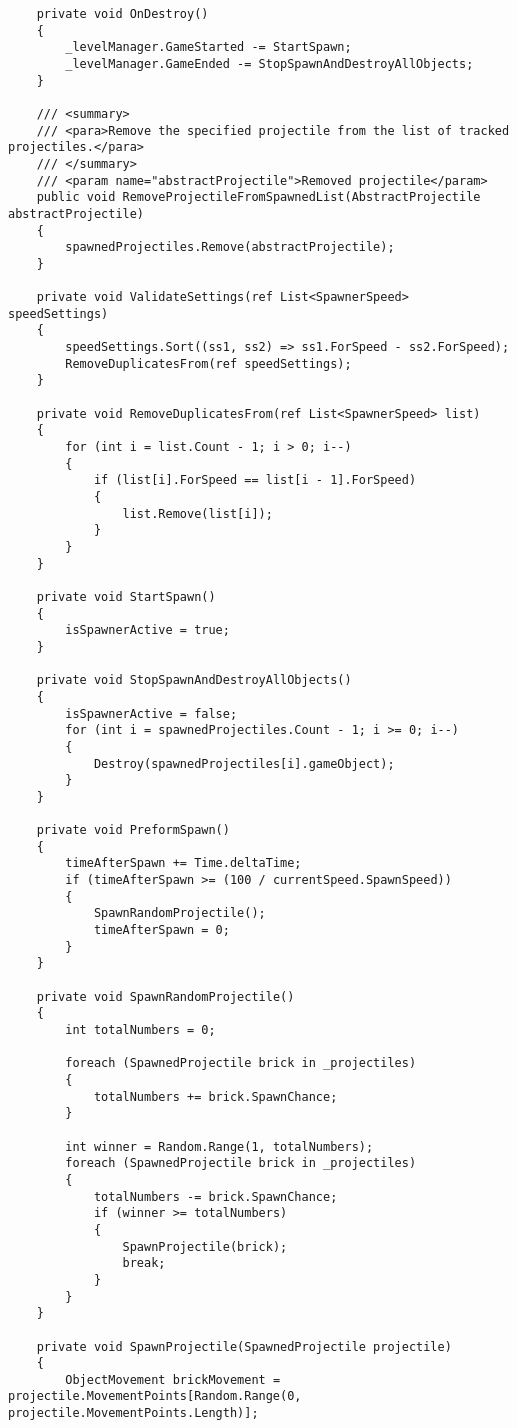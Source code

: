 \begin{verbatim}
    private void OnDestroy()
    {
        _levelManager.GameStarted -= StartSpawn;
        _levelManager.GameEnded -= StopSpawnAndDestroyAllObjects;
    }

    /// <summary>
    /// <para>Remove the specified projectile from the list of tracked projectiles.</para>
    /// </summary>
    /// <param name="abstractProjectile">Removed projectile</param>
    public void RemoveProjectileFromSpawnedList(AbstractProjectile abstractProjectile)
    {
        spawnedProjectiles.Remove(abstractProjectile);
    }

    private void ValidateSettings(ref List<SpawnerSpeed> speedSettings)
    {
        speedSettings.Sort((ss1, ss2) => ss1.ForSpeed - ss2.ForSpeed);
        RemoveDuplicatesFrom(ref speedSettings);
    }

    private void RemoveDuplicatesFrom(ref List<SpawnerSpeed> list)
    {
        for (int i = list.Count - 1; i > 0; i--)
        {
            if (list[i].ForSpeed == list[i - 1].ForSpeed)
            {
                list.Remove(list[i]);
            }
        }
    }

    private void StartSpawn()
    {
        isSpawnerActive = true;
    }

    private void StopSpawnAndDestroyAllObjects()
    {
        isSpawnerActive = false;
        for (int i = spawnedProjectiles.Count - 1; i >= 0; i--)
        {
            Destroy(spawnedProjectiles[i].gameObject);
        }
    }

    private void PreformSpawn()
    {
        timeAfterSpawn += Time.deltaTime;
        if (timeAfterSpawn >= (100 / currentSpeed.SpawnSpeed))
        {
            SpawnRandomProjectile();
            timeAfterSpawn = 0;
        }
    }

    private void SpawnRandomProjectile()
    {
        int totalNumbers = 0;

        foreach (SpawnedProjectile brick in _projectiles)
        {
            totalNumbers += brick.SpawnChance;
        }

        int winner = Random.Range(1, totalNumbers);
        foreach (SpawnedProjectile brick in _projectiles)
        {
            totalNumbers -= brick.SpawnChance;
            if (winner >= totalNumbers)
            {
                SpawnProjectile(brick);
                break;
            }
        }
    }

    private void SpawnProjectile(SpawnedProjectile projectile)
    {
        ObjectMovement brickMovement = projectile.MovementPoints[Random.Range(0, projectile.MovementPoints.Length)];


\end{verbatim}
